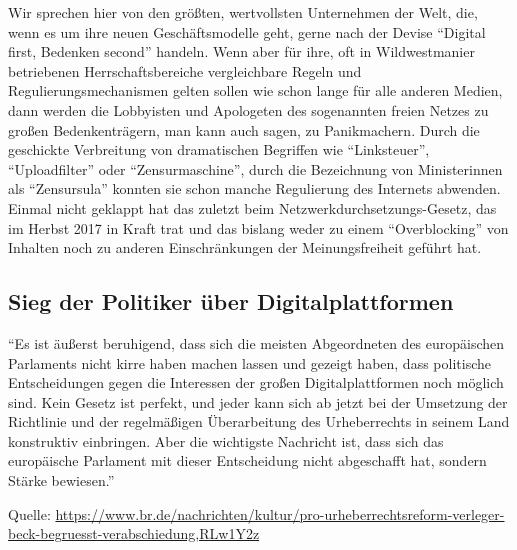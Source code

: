 \documentclass[9pt, a4paper]{scrartcl}
\newcommand{\keineNr}[1][-1]{\addtocounter{linenumber}{#1}}
\newcommand{\seitenzahl}[1][1]{\setcounter{page}{#1}}
\newcommand{\neuerText}[1][1]{\clearpage\seitenzahl\resetZeilenNr}
\begin{document}
\begin{zeilenNrZweispaltig}
{Wir sprechen hier von den größten, wertvollsten Unternehmen der Welt, die, wenn es um ihre neuen Geschäftsmodelle geht, gerne nach der Devise \enquote{Digital first, Bedenken second} handeln. Wenn aber für ihre, oft in Wildwestmanier betriebenen Herrschaftsbereiche vergleichbare Regeln und Regulierungsmechanismen gelten sollen wie schon lange für alle anderen Medien, dann werden die Lobbyisten und Apologeten des sogenannten freien Netzes zu großen Bedenkenträgern, man kann auch sagen, zu Panikmachern. Durch die geschickte Verbreitung von dramatischen Begriffen wie \enquote{Linksteuer}, \enquote{Uploadfilter} oder \enquote{Zensurmaschine}, durch die Bezeichnung von Ministerinnen als \enquote{Zensursula} konnten sie schon manche Regulierung des Internets abwenden. Einmal nicht geklappt hat das zuletzt beim Netzwerkdurchsetzungs-Gesetz, das im Herbst 2017 in Kraft trat und das bislang weder zu einem \enquote{Overblocking} von Inhalten noch zu anderen Einschränkungen der Meinungsfreiheit geführt hat.}

\subsection*{Sieg der Politiker über Digitalplattformen}\keineNr
\enquote{Es ist äußerst beruhigend, dass sich die meisten Abgeordneten des europäischen Parlaments nicht kirre haben machen lassen und gezeigt haben, dass politische Entscheidungen gegen die Interessen der großen Digitalplattformen noch möglich sind. Kein Gesetz ist perfekt, und jeder kann sich ab jetzt bei der Umsetzung der Richtlinie und der regelmäßigen Überarbeitung des Urheberrechts in seinem Land konstruktiv einbringen. Aber die wichtigste Nachricht ist, dass sich das europäische Parlament mit dieser Entscheidung nicht abgeschafft hat, sondern Stärke bewiesen.}
\end{zeilenNrZweispaltig}

{\small Quelle: \url{https://www.br.de/nachrichten/kultur/pro-urheberrechtsreform-verleger-beck-begruesst-verabschiedung,RLw1Y2z}}

\neuerText
\end{document}
